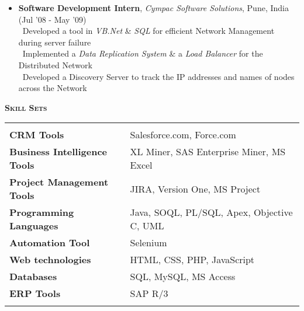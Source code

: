 \documentclass[11pt]{article}
\begin{document}
\begin{itemize}
	\item{\textbf{Software Development Intern}, \textit{Cympac Software Solutions}, 
	Pune, India \hfill (Jul '08 - May '09)}\\
		\textendash\ Developed a tool in \textit{VB.Net} \& \textit{SQL} for efficient Network Management during server failure\\
		\textendash\ Implemented a \textit{Data Replication System} \& a \textit{Load Balancer} for the Distributed Network\\
		\textendash\ Developed a Discovery Server to track the IP addresses and names of nodes across the Network
\end{itemize}
\begin{mdframed}[backgroundcolor=light-gray, linecolor=light-gray, roundcorner=10pt, shadow=false, shadowsize=1pt]
\Large{\textbf{\textsc{Skill Sets}}}
\end{mdframed}
\begin{tabular}{l    l}
 & \\
\textbf{CRM Tools} & \quad Salesforce.com, Force.com\\
\textbf{Business Intelligence Tools} & \quad XL Miner, SAS Enterprise Miner, MS Excel\\
\textbf{Project Management Tools} & \quad JIRA, Version One, MS Project\\
\textbf{Programming Languages} & \quad Java, SOQL, PL/SQL, Apex, Objective C, UML\\
\textbf{Automation Tool} & \quad Selenium\\
\textbf{Web technologies} & \quad HTML, CSS, PHP, JavaScript\\
\textbf{Databases} & \quad SQL, MySQL, MS Access \\
\textbf{ERP Tools} & \quad SAP R/3\\ \\
\end{tabular}
\end{document}
